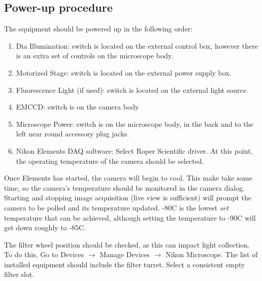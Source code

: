 \documentclass[11pt]{article}
\begin{document}
\subsection{Power-up procedure}
The equipment should be powered up in the following order:
\begin{enumerate}
\item Dia Illumination: switch is located on the external control box, however there is an extra set of controls on the microscope body.
\item Motorized Stage: switch is located on the external power supply box.
\item Fluorescence Light (if used): switch is located on the external light source. 
\item EMCCD: switch is on the camera body
\item Microscope Power: switch is on the microscope body, in the back and to the left near round accessory plug jacks.
\item Nikon Elements DAQ software: Select Roper Scientific driver. At this point, the operating temperature of the camera should be selected. 
\end{enumerate}
Once Elements has started, the camera will begin to cool. This make take some time, so the camera's temperature should be monitored in the camera dialog. Starting and stopping
image acquisition (live view is sufficient) will prompt the camera to be polled and its temperature updated. -80C is the lowest \emph{set} temperature that can be achieved, although setting the temperature to -90C  
will get down roughly to -85C. 

The filter wheel position should be checked, as this can impact light collection. To do this, Go to Devices $\rightarrow$ Manage Devices $\rightarrow$ Nikon Microscope. The list of installed equipment should include the filter turret. Select a consistent empty filter slot. 
\end{document}
